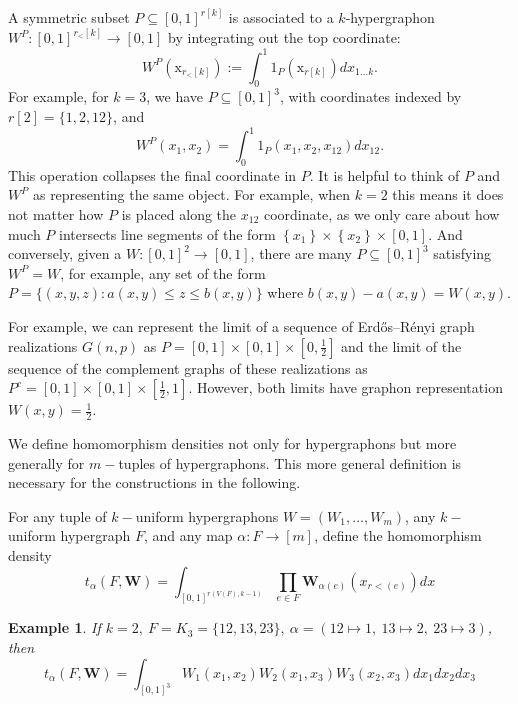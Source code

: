 \documentclass[11pt]{article}
\newtheorem{example}[theorem]{Example}
\begin{document}
A symmetric subset $P \subseteq[0,1]^{r[k]}$ is associated to a $k$-hypergraphon $W^P:[0,1]^{r_<[k]} \rightarrow[0,1]$ by integrating out the top coordinate:
$$
W^P\left(\mathrm{x}_{r_<[k]}\right):=\int_0^1 1_P\left(\mathrm{x}_{r[k]}\right) d x_{1\ldots k} .
$$
For example, for $k=3$, we have $P \subseteq[0,1]^3$, with coordinates indexed by $r[2]=\{1,2,12\}$, and
$$
W^P\left(x_1, x_2\right)=\int_0^1 1_P\left(x_1, x_2, x_{12}\right) d x_{12} .
$$
This operation collapses the final coordinate in $P$. It is helpful to think of $P$ and $W^P$ as representing the same object. For example, when $k=2$ this means it does not matter how $P$ is placed along the $x_{12}$ coordinate, as we only care about how much $P$ intersects line segments of the form $\left\{x_1\right\} \times\left\{x_2\right\} \times[0,1]$. And conversely, given a $W:[0,1]^2 \rightarrow[0,1]$, there are many $P \subseteq[0,1]^3$ satisfying $W^P=W$, for example, any set of the form $P=\{(x, y, z): a(x, y) \leq z \leq b(x, y)\}$ where $b(x, y)-a(x, y)=W(x, y)$. 

For example, we can represent the limit of a sequence of Erdős–Rényi graph realizations $G(n,p)$ as $P=[0,1]\times [0,1]\times [0,\frac{1}{2}]$ and the limit of the sequence of the complement graphs of these realizations  as $P^{c}= [0,1]\times [0,1]\times [\frac{1}{2},1]$. However, both limits have graphon representation $W(x,y)=\frac{1}{2}$.

We  define homomorphism densities not only for hypergraphons but more generally for $m-$tuples of hypergraphons. This more general definition is necessary for the constructions in the following.  

For any tuple of $k-$uniform hypergraphons $W=(W_1,\ldots,W_m)$, any $k-$uniform hypergraph $F$, and any map $\alpha: F\rightarrow [m]$, define the homomorphism density
\begin{equation}\label{eqn:homdensHyp}
t_{\alpha}(F,\mathbf{W})=\int_{[0,1]^{r(V(F),k-1)}}\prod_{e\in F}\mathbf{W}_{\alpha(e)}(x_{r<(e)})dx
\end{equation}
\begin{example}
If $k=2, \ F=K_3=\{12, 13, 23\}, \ \alpha=(12\mapsto 1,\ 13\mapsto 2,\ 23\mapsto 3)$, then
$$
t_{\alpha}(F,\mathbf{W})=\int_{[0,1]^3}W_1(x_1,x_2)W_2(x_1,x_3)W_3(x_2,x_3)dx_1 dx_2 dx_3
$$
\end{example}
\end{document}
